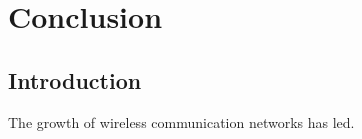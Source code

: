 \chapter{Conclusion} \label{Ch:5}
	
\section{Introduction} \label{sec:Introduction5}
The growth of wireless communication networks has led.
